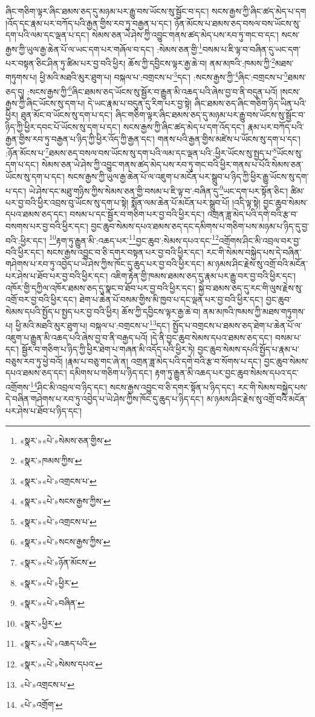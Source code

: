 ཞིང་གཅིག་ལྟར་ཞིང་ཐམས་ཅད་དུ་མཉམ་པར་རྒྱུ་བས་ཡོངས་སུ་སྦྱོང་བ་དང་། སངས་རྒྱས་ཀྱི་ཞིང་ཚད་མེད་པ་དག །འོད་དང་རྣམ་པར་བཀོད་པའི་རྒྱན་གྱིས་རབ་ཏུ་བརྒྱན་པ་དང་། ཉོན་མོངས་པ་ཐམས་ཅད་བསལ་བས་ཡོངས་སུ་དག་པའི་ལམ་དང་ལྡན་པ་དང་། སེམས་ཅན་ཡེ་ཤེས་ཀྱི་འབྱུང་གནས་ཚད་མེད་པས་རབ་ཏུ་གང་བ་དང་། སངས་རྒྱས་ཀྱི་ཡུལ་རྒྱ་ཆེན་པོ་ལ་ཡང་དག་པར་གཞོལ་བ་དང་། :སེམས་ཅན་གྱི་\footnote{«སྣར་»«པེ་»སེམས་ཅན་གྱིས་}བསམ་པ་ཇི་ལྟ་བ་བཞིན་དུ་ཡང་དག་པར་བསྟན་ཅིང་ཤིན་ཏུ་ཚིམ་པར་བྱ་བའི་ཕྱིར། ཆོས་ཀྱི་དབྱིངས་ལྟར་རྒྱ་ཆེ་བ། ནམ་མཁའི་:ཁམས་ཀྱི་\footnote{«སྣར་»ཁམས་ཀྱིས་}མཐས་གཏུགས་པ། ཕྱི་མའི་མཐའི་མུར་ཐུག་པ། བསྐལ་པ་:བགྲངས་པ་\footnote{«སྣར་»«པེ་»འགྲངས་པ་}དང་། :སངས་རྒྱས་ཀྱི་\footnote{«སྣར་»«པེ་»སངས་རྒྱས་ཀྱིས་}ཞིང་:བགྲངས་པ་\footnote{«སྣར་»«པེ་»འགྲངས་པ་}ཐམས་ཅད་དུ། :སངས་རྒྱས་ཀྱི་\footnote{«སྣར་»«པེ་»སངས་རྒྱས་ཀྱིས་}ཞིང་ཐམས་ཅད་ཡོངས་སུ་སྦྱོར་བ་རྒྱུན་མི་འཆད་པའི་ཞེས་བྱ་བ་ནི་བདུན་པའོ། །སངས་རྒྱས་ཀྱི་ཞིང་ཡོངས་སུ་དག་པ། དེ་ཡང་རྣམ་པ་བདུན་དུ་རིག་པར་བྱ་སྟེ། ཞིང་ཐམས་ཅད་ཞིང་གཅིག་ཉིད་ཡིན་པའི་ཕྱིར། ཐུན་མོང་བ་ཡོངས་སུ་དག་པ་དང་། ཞིང་གཅིག་ལྟར་ཞིང་ཐམས་ཅད་དུ་མཉམ་པར་རྒྱུ་བས་ཡོངས་སུ་སྦྱོང་བ་ཉིད་ཀྱི་ཕྱིར་དབང་པོ་ཡོངས་སུ་དག་པ་དང་། སངས་རྒྱས་ཀྱི་ཞིང་ཚད་མེད་པ་དག་འོད་དང་། རྣམ་པར་བཀོད་པའི་རྒྱན་གྱིས་རབ་ཏུ་བརྒྱན་པ་ཉིད་ཀྱི་ཕྱིར་འོད་ཀྱི་རྒྱན་དང་། གནས་པའི་རྒྱན་གྱིས་མཛེས་པ་ཡོངས་སུ་དག་པ་དང་། :ཉོན་མོངས་པ་\footnote{«སྣར་»«པེ་»ཉོན་མོངས་}ཐམས་ཅད་བསལ་བས་ཡོངས་སུ་དག་པའི་ལམ་དང་ལྡན་པའི་:ཕྱིར་ཡོངས་སུ་སྤྱད་པ་\footnote{«སྣར་»«པེ་»ཕྱིར་}ཡོངས་སུ་དག་པ་དང་། སེམས་ཅན་ཡེ་ཤེས་ཀྱི་འབྱུང་གནས་ཚད་མེད་པས་རབ་ཏུ་གང་བའི་ཕྱིར་གནས་པ་པོའི་སེམས་ཅན་ཡོངས་སུ་དག་པ་དང་། སངས་རྒྱས་ཀྱི་ཡུལ་རྒྱ་ཆེན་པོ་ལ་འཇུག་པ་མངོན་པར་སྒྲུབ་པ་ཉིད་ཀྱི་ཕྱིར་རྒྱུ་ཡོངས་སུ་དག་པ་དང་། ཡེ་ཤེས་དང་མཐུ་གཉིས་ཀྱིས་སེམས་ཅན་གྱི་བསམ་པ་ཇི་ལྟ་བ་:བཞིན་དུ་\footnote{«སྣར་»«པེ་»བཞིན་}ཡང་དག་པར་སྟོན་ཅིང་། ཚིམ་པར་བྱ་བའི་ཕྱིར་འབྲས་བུ་ཡོངས་སུ་དག་པ་སྟེ། སྨོན་ལམ་ཆེན་པོ་མངོན་པར་སྒྲུབ་པོ། །འདི་ལྟ་སྟེ། བྱང་ཆུབ་སེམས་དཔའ་ཐམས་ཅད་དང་། བསམ་པ་དང་སྦྱོར་བ་གཅིག་པར་བྱ་བའི་ཕྱིར་དང་། འགྲན་ཟླ་མེད་པའི་དགེ་བའི་རྩ་བ་བསགས་པར་བྱ་བའི་ཕྱིར་དང་། བྱང་ཆུབ་སེམས་དཔའ་ཐམས་ཅད་དང་དམིགས་པ་གཅིག་པས་མཉམ་པ་ཉིད་དུ་བྱ་བའི་:ཕྱིར་དང་། \footnote{«སྣར་»ཕྱིར་}རྟག་ཏུ་རྒྱུན་མི་:འཆད་པར་\footnote{«སྣར་»«པེ་»འཆད་པའི་}བྱང་ཆུབ་:སེམས་དཔའ་དང་\footnote{«སྣར་»«པེ་»སེམས་དཔའ་}འགྲོགས་ཤིང་མི་འབྲལ་བར་བྱ་བའི་ཕྱིར་དང་། སངས་རྒྱས་འབྱུང་བ་ཅི་དགར་བསྟན་པར་བྱ་བའི་ཕྱིར་དང་། རང་གི་སེམས་བསྐྱེད་པས་དེ་བཞིན་གཤེགས་པ་རབ་ཏུ་འབྱེད་པ་ཡེ་ཤེས་ཀྱིས་ཁོང་དུ་ཆུད་པར་བྱ་བའི་ཕྱིར་དང་། མ་ཉམས་ཤིང་རྗེས་སུ་འགྲོ་བའི་མངོན་པར་ཤེས་པ་ཐོབ་པར་བྱ་བའི་ཕྱིར་དང་། འཇིག་རྟེན་གྱི་ཁམས་ཐམས་ཅད་དུ་རྣམ་པར་རྒྱུ་བར་བྱ་བའི་ཕྱིར་དང་། འཁོར་གྱི་དཀྱིལ་འཁོར་ཐམས་ཅད་དུ་སྣང་བ་ཐོབ་པར་བྱ་བའི་ཕྱིར་དང་། སྐྱེ་བ་ཐམས་ཅད་དུ་རང་གི་ལུས་རྗེས་སུ་འགྲོ་བར་བྱ་བའི་ཕྱིར་དང་། ཐེག་པ་ཆེན་པོ་བསམ་གྱིས་མི་ཁྱབ་པ་དང་ལྡན་པར་བྱ་བའི་ཕྱིར་དང་། བྱང་ཆུབ་སེམས་དཔའི་སྤྱོད་པ་སྤྱད་པར་བྱ་བའི་ཕྱིར། ཆོས་ཀྱི་དབྱིངས་ལྟར་རྒྱ་ཆེ་བ། ནམ་མཁའི་ཁམས་ཀྱི་མཐས་གཏུགས་པ། ཕྱི་མའི་མཐའི་མུར་ཐུག་པ། བསྐལ་པ་:བགྲངས་པ་\footnote{«པེ་»འགྲངས་པ་}དང་། སྤྱོད་པ་བགྲངས་པ་ཐམས་ཅད་ཐེག་པ་ཆེན་པོ་ལ་འཇུག་པ་རྒྱུན་མི་འཆད་པའི་ཞེས་བྱ་བ་ནི་བརྒྱད་པའོ། །དེ་ནི་བྱང་ཆུབ་སེམས་དཔའ་ཐམས་ཅད་དང་། བསམ་པ་དང་། སྦྱོར་བ་གཅིག་པ་ཉིད་ཀྱི་ཕྱིར་ཐེག་པ་གཞན་མི་འདོད་པའི་ཕྱིར་ཏེ། བྱང་ཆུབ་སེམས་དཔའི་སྤྱོད་པ་རྣམ་པ་བཅུས་རབ་ཏུ་ཕྱེ་བའོ། །རྣམ་པ་བཅུ་གང་ཞེ་ན། འགྲན་ཟླ་མེད་པའི་དགེ་བའི་རྩ་བ་སོགས་པ་དང་། བྱང་ཆུབ་སེམས་དཔའ་ཐམས་ཅད་དང་། དམིགས་པ་གཅིག་པ་ཉིད་དང་། རྟག་ཏུ་རྒྱུན་མི་འཆད་པར་བྱང་ཆུབ་སེམས་དཔའ་དང་འགྲོགས་\footnote{«པེ་»འགྲོག་}ཤིང་མི་འབྲལ་བ་ཉིད་དང་། སངས་རྒྱས་འབྱུང་བ་ཅི་དགར་སྟོན་པ་ཉིད་དང་། རང་གི་སེམས་བསྐྱེད་པས་དེ་བཞིན་གཤེགས་པ་རབ་ཏུ་འབྱེད་པ་ཡེ་ཤེས་ཀྱིས་ཁོང་དུ་ཆུད་པ་ཉིད་དང་། མ་ཉམས་ཤིང་རྗེས་སུ་འགྲོ་བའི་མངོན་པར་ཤེས་པ་ཐོབ་པ་ཉིད་དང་། 